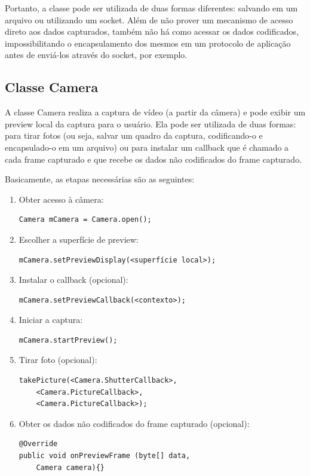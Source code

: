 \documentclass{acm_proc_article-sp}
\begin{document}
Portanto, a classe pode ser utilizada de duas formas diferentes: salvando em um arquivo ou utilizando um socket. Além de não prover um mecanismo de acesso direto aos dados capturados, também não há como acessar os dados codificados, impossibilitando o encapsulamento dos mesmos em um protocolo de aplicação antes de enviá-los através do socket, por exemplo. 

\subsection{Classe Camera}
A classe Camera realiza a captura de vídeo (a partir da câmera) e pode exibir um preview local da captura para o usuário. Ela pode ser utilizada de duas formas: para tirar fotos (ou seja, salvar um quadro da captura, codificando-o e encapsulado-o em um arquivo) ou para instalar um callback que é chamado a cada frame capturado e que recebe os dados não codificados do frame capturado.


Basicamente, as etapas necessárias são as seguintes:
\begin{enumerate}
 \item Obter acesso à câmera:
  \begin{verbatim}
Camera mCamera = Camera.open();
  \end{verbatim}
 \item Escolher a superfície de preview:
  \begin{verbatim}
mCamera.setPreviewDisplay(<superfície local>);
  \end{verbatim}
 \item Instalar o callback (opcional):
  \begin{verbatim}
mCamera.setPreviewCallback(<contexto>);
  \end{verbatim}
 \item Iniciar a captura:
  \begin{verbatim}
mCamera.startPreview();
  \end{verbatim}
 \item Tirar foto (opcional):
  \begin{verbatim}
takePicture(<Camera.ShutterCallback>,
    <Camera.PictureCallback>,
    <Camera.PictureCallback>);
  \end{verbatim}
 \item Obter os dados não codificados do frame capturado (opcional):
  \begin{verbatim}
@Override
public void onPreviewFrame (byte[] data, 
    Camera camera){}
  \end{verbatim}
\end{enumerate}
\end{document}
